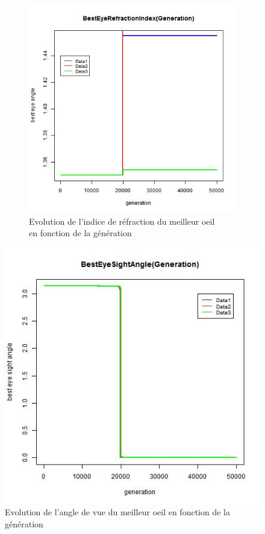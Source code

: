 \documentclass[a4paper,11pt]{article}
\begin{document}
\begin{figure}
\begin{subfigure}{.5\textwidth}
\includegraphics[width=1\linewidth]{best_eye_refraction_index.jpeg}
\caption{Evolution de l'indice de réfraction du meilleur oeil \\en fonction de la génération}
\label{fig:modelisation}
\end{subfigure}
\caption{}
\label{fig:test}
\end{figure}

%

\begin{figure}[htbp]
\begin{center}
\includegraphics[width=.5\linewidth]{best_eye_sight_angle.jpeg}
\caption{Evolution de l'angle de vue du meilleur oeil en fonction de la génération}
\label{fig:modelisation}
\end{center}
\end{figure}
\end{document}
